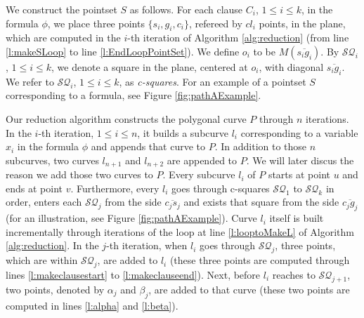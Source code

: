 \documentclass[a4paper,UKenglish]{lipics}
\newcommand{\CS}{{\mathscr S}}
\newcommand{\CQ}{{\mathscr Q}}
\newcommand{\gre}{{g}}
\newcommand{\sma}{{s}}
\newcommand{\cfev}{{l}} \newcommand{\sq}{{\CS\CQ}}
\newcommand{\Seg}[1]{{\overline{#1}}}
\begin{document}
We construct the pointset $S$ as follows.
For each clause $C_i$, $1 \le i \le k$, in the formula $\phi$, 
we place three points $\{s_i, g_i,c_i\}$, refereed by $cl_i$ points, 
in the plane, which are computed
in the $i$-th iteration of Algorithm \ref{alg:reduction} (from line \ref{l:makeSLoop} to line \ref{l:EndLoopPointSet}).
We define $o_i$ to be $M(\Seg{\sma_i\gre_i})$.
By $\sq_i$, $1\le i \le k$, we denote
a square in the plane, centered at $o_i$, 
with diagonal $\Seg{\sma_i \gre_i}$. 
We refer to $\sq_i$, $1\le i \le k$, as
{\em c-squares}. 
For an example of a pointset $S$ corresponding to a formula, 
see Figure \ref{fig:pathAExample}.


Our reduction algorithm constructs the polygonal curve $P$ 
through $n$ iterations. In  the $i$-th iteration, $1 \le i \le n$,
it builds a subcurve $\cfev_i$ corresponding to  a variable 
$x_i$ in the formula $\phi$ and appends that curve to $P$.
In addition to those $n$ subcurves, two curves 
$\cfev_{n+1}$ and $\cfev_{n+2}$ are appended to $P$. 
We will later discus the reason we add those 
two curves to $P$. 
Every subcurve  $\cfev_i$ of $P$ starts at point $u$ 
and ends at point $v$.
Furthermore, every $\cfev_i$  goes through c-squares
$\sq_1$ to $\sq_k$ in order, enters each  $\sq_j$ from
the side $\Seg{c_j s_j}$  and exists that square from 
the side $\Seg{c_j g_j}$  (for an illustration, see Figure \ref{fig:pathAExample}). 
Curve $\cfev_i$ itself is built incrementally  
through iterations of the loop at line \ref{l:looptoMakeL} 
of Algorithm \ref{alg:reduction}. 
In the $j$-th iteration, when $\cfev_i$ goes through $\sq_j$,
three points, which are within  $\sq_j$, are added to  $\cfev_i$ 
(these three points are computed through lines 
\ref{l:makeclausestart} to \ref{l:makeclauseend}).
Next, before $\cfev_i$ reaches to $\sq_{j+1}$,
two points,  denoted by $\alpha_j$ and $\beta_j$, are added to that curve 
(these two points are computed in lines \ref{l:alpha} 
and \ref{l:beta}).
\end{document}
